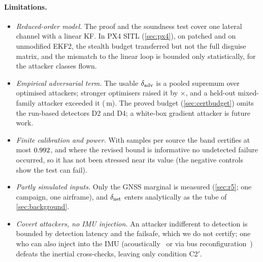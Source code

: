 \paragraph{Limitations.}
\begin{itemize}
\item \emph{Reduced-order model.} The proof and the soundness test cover one
  lateral channel with a linear KF. In PX4 SITL (\cref{sec:px4}), on patched and on
  unmodified EKF2, the stealth budget transferred but not the full disguise
  matrix, and the mismatch to the linear loop is bounded only statistically, for
  the attacker classes flown.
\item \emph{Empirical adversarial term.} The usable $\delta_{\mathrm{adv}}$ is a pooled supremum
  over optimised attackers; stronger optimisers raised it by
  \nROneDadvRatioFive$\times$, and a held-out mixed-family attacker exceeded it
  (\nROneAdvMax\,m). The proved budget (\cref{sec:certbudget}) omits the
  run-based detectors D2 and D4; a white-box gradient attacker is future work.
\item \emph{Finite calibration and power.} With \nCalMissions{} samples per
  source the band certifies at most $0.992$, and where the
  revised bound is informative no undetected failure occurred, so it has not
  been stressed near its value (the negative controls show the test can fail).
\item \emph{Partly simulated inputs.} Only the GNSS marginal is measured
  (\cref{sec:r5}; one campaign, one airframe), and $\delta_{\mathrm{net}}$ enters analytically
  as the tube of \cref{sec:background}.
\item \emph{Covert attackers, no IMU injection.} An attacker indifferent to
  detection is bounded by detection latency and the failsafe, which we do not
  certify; one who can also inject into the IMU
  (acoustically~\cite{son2015,trippel2017} or via bus
  reconfiguration~\cite{erba2025}) defeats the inertial cross-checks, leaving
  only condition C2$'$.
\end{itemize}
